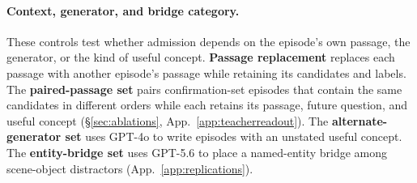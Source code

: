 \paragraph{Context, generator, and bridge category.}
These controls test whether admission depends on the episode's own
passage, the generator, or the kind of useful concept.
\textbf{Passage replacement} replaces each passage with another
episode's passage while retaining its candidates and labels.
The \textbf{paired-passage set} pairs confirmation-set episodes that
contain the same candidates in different orders while each retains
its passage, future question, and useful concept
(\S\ref{sec:ablations}, App.~\ref{app:teacherreadout}).
The \textbf{alternate-generator set} uses GPT-4o to write episodes
with an unstated useful concept. The \textbf{entity-bridge set} uses
GPT-5.6 to place a named-entity bridge among scene-object distractors
(App.~\ref{app:replications}).

